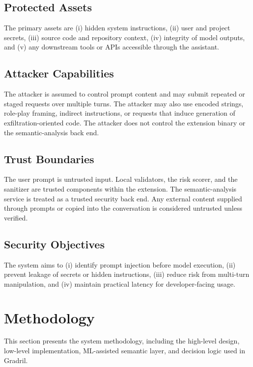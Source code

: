 \documentclass[journal]{IEEEtran}
\begin{document}
\subsection{Protected Assets}
The primary assets are (i) hidden system instructions, (ii) user and project secrets, (iii) source code and repository context, (iv) integrity of model outputs, and (v) any downstream tools or APIs accessible through the assistant.

\subsection{Attacker Capabilities}
The attacker is assumed to control prompt content and may submit repeated or staged requests over multiple turns. The attacker may also use encoded strings, role-play framing, indirect instructions, or requests that induce generation of exfiltration-oriented code. The attacker does not control the extension binary or the semantic-analysis back end.

\subsection{Trust Boundaries}
The user prompt is untrusted input. Local validators, the risk scorer, and the sanitizer are trusted components within the extension. The semantic-analysis service is treated as a trusted security back end. Any external content supplied through prompts or copied into the conversation is considered untrusted unless verified.

\subsection{Security Objectives}
The system aims to (i) identify prompt injection before model execution, (ii) prevent leakage of secrets or hidden instructions, (iii) reduce risk from multi-turn manipulation, and (iv) maintain practical latency for developer-facing usage.

\section{Methodology}
This section presents the system methodology, including the high-level design, low-level implementation, ML-assisted semantic layer, and decision logic used in Gradril.
\end{document}
